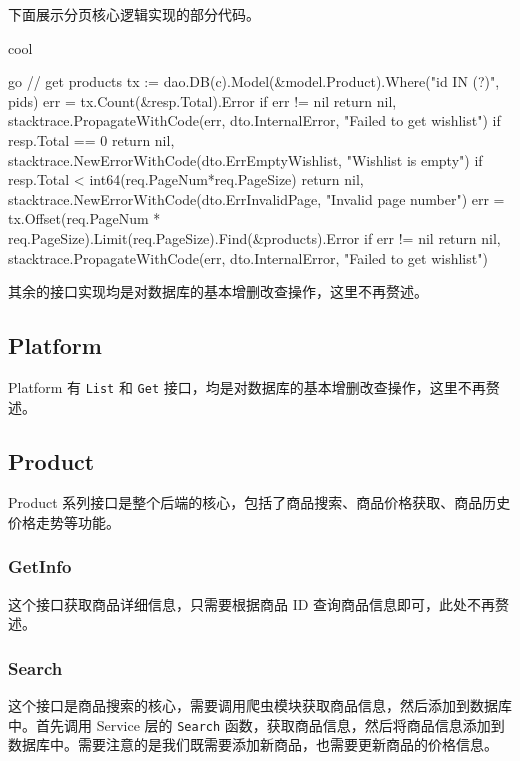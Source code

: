 下面展示分页核心逻辑实现的部分代码。

\begin{codebox}{}{cool}
\begin{amzcode}{go}
// get products
tx := dao.DB(c).Model(&model.Product{}).Where("id IN (?)", pids)
err = tx.Count(&resp.Total).Error
if err != nil {
    return nil, stacktrace.PropagateWithCode(err, dto.InternalError, "Failed to get wishlist")
}
if resp.Total == 0 {
    return nil, stacktrace.NewErrorWithCode(dto.ErrEmptyWishlist, "Wishlist is empty")
}
if resp.Total < int64(req.PageNum*req.PageSize) {
    return nil, stacktrace.NewErrorWithCode(dto.ErrInvalidPage, "Invalid page number")
}
err = tx.Offset(req.PageNum * req.PageSize).Limit(req.PageSize).Find(&products).Error
if err != nil {
    return nil, stacktrace.PropagateWithCode(err, dto.InternalError, "Failed to get wishlist")
}
\end{amzcode}
\end{codebox}

其余的接口实现均是对数据库的基本增删改查操作，这里不再赘述。

\subsection{Platform}

Platform 有 \texttt{List} 和 \texttt{Get} 接口，均是对数据库的基本增删改查操作，这里不再赘述。

\subsection{Product}

Product 系列接口是整个后端的核心，包括了商品搜索、商品价格获取、商品历史价格走势等功能。

\subsubsection{GetInfo}

这个接口获取商品详细信息，只需要根据商品 ID 查询商品信息即可，此处不再赘述。

\subsubsection{Search}

这个接口是商品搜索的核心，需要调用爬虫模块获取商品信息，然后添加到数据库中。首先调用 Service 层的 \texttt{Search} 函数，获取商品信息，然后将商品信息添加到数据库中。需要注意的是我们既需要添加新商品，也需要更新商品的价格信息。

